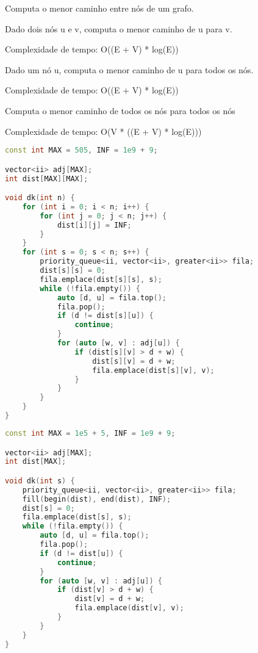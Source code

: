 \documentclass[11pt, a4paper, oneside]{book}
\begin{document}
Computa o menor caminho entre nós de um grafo.



\textbf{} 


Dado dois nós u e v, computa o menor caminho de u para v.



Complexidade de tempo: O((E + V) * log(E))



\textbf{} 


Dado um nó u, computa o menor caminho de u para todos os nós.



Complexidade de tempo: O((E + V) * log(E))



\textbf{} 


Computa o menor caminho de todos os nós para todos os nós



Complexidade de tempo: O(V * ((E + V) * log(E)))

\hfill

\begin{multicols}{2}
\begin{lstlisting}[language=C++]
const int MAX = 505, INF = 1e9 + 9;

vector<ii> adj[MAX];
int dist[MAX][MAX];

void dk(int n) {
    for (int i = 0; i < n; i++) {
        for (int j = 0; j < n; j++) {
            dist[i][j] = INF;
        }
    }
    for (int s = 0; s < n; s++) {
        priority_queue<ii, vector<ii>, greater<ii>> fila;
        dist[s][s] = 0;
        fila.emplace(dist[s][s], s);
        while (!fila.empty()) {
            auto [d, u] = fila.top();
            fila.pop();
            if (d != dist[s][u]) {
                continue;
            }
            for (auto [w, v] : adj[u]) {
                if (dist[s][v] > d + w) {
                    dist[s][v] = d + w;
                    fila.emplace(dist[s][v], v);
                }
            }
        }
    }
}
\end{lstlisting}
\end{multicols}

\hfill

\begin{multicols}{2}
\begin{lstlisting}[language=C++]
const int MAX = 1e5 + 5, INF = 1e9 + 9;

vector<ii> adj[MAX];
int dist[MAX];

void dk(int s) {
    priority_queue<ii, vector<ii>, greater<ii>> fila;
    fill(begin(dist), end(dist), INF);
    dist[s] = 0;
    fila.emplace(dist[s], s);
    while (!fila.empty()) {
        auto [d, u] = fila.top();
        fila.pop();
        if (d != dist[u]) {
            continue;
        }
        for (auto [w, v] : adj[u]) {
            if (dist[v] > d + w) {
                dist[v] = d + w;
                fila.emplace(dist[v], v);
            }
        }
    }
}
\end{lstlisting}
\end{multicols}
\end{document}
